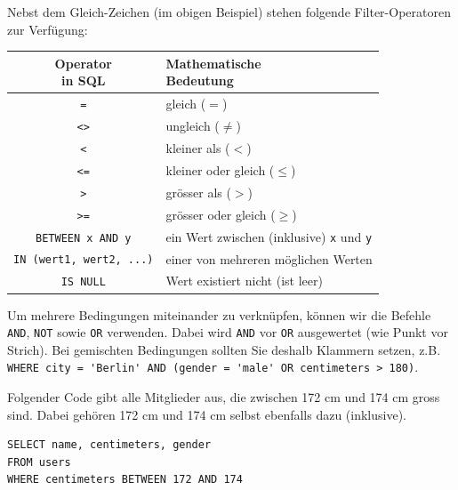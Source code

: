 Nebst dem Gleich-Zeichen (im obigen Beispiel) stehen folgende Filter-Operatoren zur Verfügung:
\begin{table}[H]
  \centering
  \begin{tabular}{cl}
    \makecell{\textbf{Operator}                                                                 \\\textbf{in \gls{SQL}}} & \makecell{\textbf{Mathematische}\\\textbf{Bedeutung}} \\\midrule
    \texttt{=}                                    & gleich ($=$)                                \\
    \texttt{<>}                                   & ungleich ($\neq$)                           \\
    \texttt{<}                                    & kleiner als ($<$)                           \\
    \texttt{<=}                                   & kleiner oder gleich ($\leq$)                \\
    \texttt{>}                                    & grösser als ($>$)                           \\
    \texttt{>=}                                   & grösser oder gleich ($\geq$)                \\
    \lstinline|BETWEEN x AND y|        & ein Wert zwischen (inklusive) \texttt{x} und \texttt{y} \\
    \lstinline|IN (wert1, wert2, ...)| & einer von mehreren möglichen Werten         \\
    \lstinline|IS NULL|                & Wert existiert nicht (ist leer)                        \\
  \end{tabular}
\end{table}
Um mehrere Bedingungen miteinander zu verknüpfen, können wir die Befehle \lstinline|AND|, \lstinline|NOT| sowie \lstinline|OR| verwenden.
Dabei wird \lstinline|AND| vor \lstinline|OR| ausgewertet (wie Punkt vor Strich). Bei gemischten Bedingungen sollten Sie deshalb Klammern setzen, z.B. \lstinline|WHERE city = 'Berlin' AND (gender = 'male' OR centimeters > 180)|.

\begin{myexample}\label{myexample:between}
Folgender Code gibt alle Mitglieder aus, die zwischen 172 cm und 174 cm gross sind. Dabei gehören 172 cm und 174 cm selbst ebenfalls dazu (inklusive).

\begin{lstlisting}
SELECT name, centimeters, gender
FROM users
WHERE centimeters BETWEEN 172 AND 174
\end{lstlisting}
\end{myexample}


